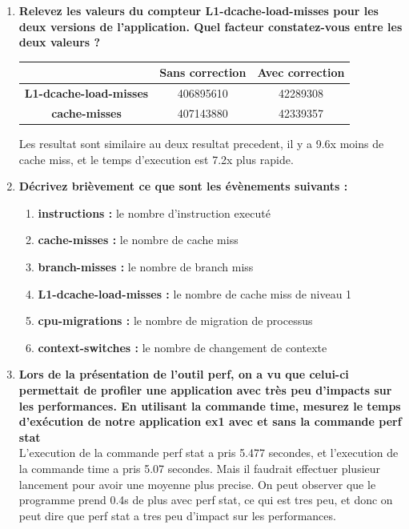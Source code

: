 \documentclass[
	a4paper, %
	10pt, %
]{CSUniSchoolLabReport}
\begin{document}
\begin{enumerate}[label=\textbf{\arabic*}]
\item \textbf{Relevez les valeurs du compteur L1-dcache-load-misses pour les deux versions de l’application. Quel facteur constatez-vous entre les deux valeurs ?}

\begin{center}
	\begin{tabular}{|c|c|c|}
		\hline
		& \textbf{Sans correction} & \textbf{Avec correction} \\
		\hline
		\textbf{L1-dcache-load-misses} & 406895610 & 42289308 \\
		\hline
		\textbf{cache-misses} & 407143880 & 42339357 \\
		\hline
	\end{tabular}
\end{center}
Les resultat sont similaire au deux resultat precedent, il y a 9.6x moins de cache miss, et le temps d'execution est 7.2x plus rapide.


\item \textbf{Décrivez brièvement ce que sont les évènements suivants :}
\begin{enumerate}[label=\textbf{\alph*}]
	\item \textbf{instructions :} le nombre d'instruction executé
	\item \textbf{cache-misses :} le nombre de cache miss
	\item \textbf{branch-misses :} le nombre de branch miss
	\item \textbf{L1-dcache-load-misses :} le nombre de cache miss de niveau 1
	\item \textbf{cpu-migrations :} le nombre de migration de processus
	\item \textbf{context-switches :} le nombre de changement de contexte
\end{enumerate}

\item \textbf{Lors de la présentation de l’outil perf, on a vu que celui-ci permettait de profiler une application avec très peu d’impacts sur les performances. En utilisant la commande time, mesurez le temps d’exécution de notre application ex1 avec et sans la commande perf stat}\\
L'execution de la commande perf stat a pris 5.477 secondes, et l'execution de la commande time a pris 5.07 secondes. Mais il faudrait effectuer plusieur lancement pour avoir une moyenne plus precise.
On peut observer que le programme prend 0.4s de plus avec perf stat, ce qui est tres peu, et donc on peut dire que perf stat a tres peu d'impact sur les performances.

\end{enumerate}
\end{document}
